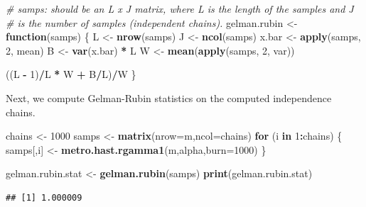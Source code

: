 \documentclass[
  11pt,
]{paper}
\newenvironment{Shaded}{\begin{snugshade}}{\end{snugshade}}
\newcommand{\AttributeTok}[1]{\textcolor[rgb]{0.13,0.29,0.53}{#1}}
\newcommand{\CommentTok}[1]{\textcolor[rgb]{0.56,0.35,0.01}{\textit{#1}}}
\newcommand{\ControlFlowTok}[1]{\textcolor[rgb]{0.13,0.29,0.53}{\textbf{#1}}}
\newcommand{\DecValTok}[1]{\textcolor[rgb]{0.00,0.00,0.81}{#1}}
\newcommand{\FunctionTok}[1]{\textcolor[rgb]{0.13,0.29,0.53}{\textbf{#1}}}
\newcommand{\NormalTok}[1]{#1}
\newcommand{\OtherTok}[1]{\textcolor[rgb]{0.56,0.35,0.01}{#1}}
\newcommand{\SpecialCharTok}[1]{\textcolor[rgb]{0.81,0.36,0.00}{\textbf{#1}}}
\begin{document}
\begin{Shaded}
\begin{Highlighting}[]
\CommentTok{\# samps: should be an L x J matrix, where L is the length of the samples and J}
\CommentTok{\# is the number of samples (independent chains).}
\NormalTok{gelman.rubin }\OtherTok{\textless{}{-}} \ControlFlowTok{function}\NormalTok{(samps) \{}
\NormalTok{    L }\OtherTok{\textless{}{-}} \FunctionTok{nrow}\NormalTok{(samps)}
\NormalTok{    J }\OtherTok{\textless{}{-}} \FunctionTok{ncol}\NormalTok{(samps)}
\NormalTok{    x.bar }\OtherTok{\textless{}{-}} \FunctionTok{apply}\NormalTok{(samps, }\DecValTok{2}\NormalTok{, mean)}
\NormalTok{    B }\OtherTok{\textless{}{-}} \FunctionTok{var}\NormalTok{(x.bar) }\SpecialCharTok{*}\NormalTok{ L}
\NormalTok{    W }\OtherTok{\textless{}{-}} \FunctionTok{mean}\NormalTok{(}\FunctionTok{apply}\NormalTok{(samps, }\DecValTok{2}\NormalTok{, var))}

\NormalTok{    ((L }\SpecialCharTok{{-}} \DecValTok{1}\NormalTok{)}\SpecialCharTok{/}\NormalTok{L }\SpecialCharTok{*}\NormalTok{ W }\SpecialCharTok{+}\NormalTok{ B}\SpecialCharTok{/}\NormalTok{L)}\SpecialCharTok{/}\NormalTok{W}
\NormalTok{\}}
\end{Highlighting}
\end{Shaded}

Next, we compute Gelman-Rubin statistics on the computed independence
chains.

\begin{Shaded}
\begin{Highlighting}[]
\NormalTok{chains }\OtherTok{\textless{}{-}} \DecValTok{1000}
\NormalTok{samps }\OtherTok{\textless{}{-}} \FunctionTok{matrix}\NormalTok{(}\AttributeTok{nrow=}\NormalTok{m,}\AttributeTok{ncol=}\NormalTok{chains)}
\ControlFlowTok{for}\NormalTok{ (i }\ControlFlowTok{in} \DecValTok{1}\SpecialCharTok{:}\NormalTok{chains)}
\NormalTok{\{}
\NormalTok{  samps[,i] }\OtherTok{\textless{}{-}} \FunctionTok{metro.hast.rgamma1}\NormalTok{(m,alpha,}\AttributeTok{burn=}\DecValTok{1000}\NormalTok{)}
\NormalTok{\}}

\NormalTok{gelman.rubin.stat }\OtherTok{\textless{}{-}} \FunctionTok{gelman.rubin}\NormalTok{(samps)}
\FunctionTok{print}\NormalTok{(gelman.rubin.stat)}
\end{Highlighting}
\end{Shaded}

\begin{verbatim}
## [1] 1.000009
\end{verbatim}
\end{document}
